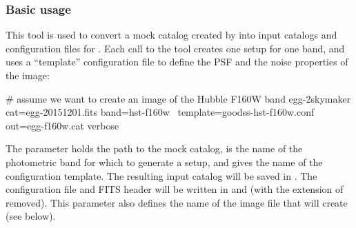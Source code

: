 \subsubsection{Basic usage}

This tool is used to convert a mock catalog created by  into input catalogs and configuration files for \skymaker. Each call to the tool creates one \skymaker setup for one band, and uses a ``template'' \skymaker configuration file to define the PSF and the noise properties of the image:
\begin{bashcode}
# assume we want to create an image of the Hubble F160W band
egg-2skymaker cat=egg-20151201.fits band=hst-f160w \
    template=goodss-hst-f160w.conf out=egg-f160w.cat verbose
\end{bashcode}
The  parameter holds the path to the mock catalog,  is the name of the photometric band for which to generate a \skymaker setup, and  gives the name of the \skymaker configuration template. The resulting \skymaker input catalog will be saved in . The \skymaker configuration file and FITS header will be written in  and  (with the extension of  removed). This parameter also defines the name of the image file that \skymaker will create (see below).

